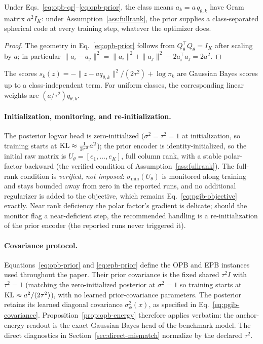\begin{proposition}
\label{prop:opb-frame}
Under Eqs.~\eqref{eq:opb-qr}--\eqref{eq:opb-prior}, the class means
$a_k = a\,q_{\theta,k}$ have Gram matrix $a^2 I_K$: under
Assumption~\ref{ass:fullrank}, the prior
supplies a class-separated spherical code at every training step, whatever the
optimizer does.
\end{proposition}

\begin{proof}
The geometry in Eq.~\eqref{eq:opb-prior} follows from
$Q_\theta^{\top}Q_\theta = I_K$ after scaling by $a$; in particular
$\|a_i - a_j\|^2 = \|a_i\|^2 + \|a_j\|^2 - 2a_i^{\top}a_j = 2a^2$.
\end{proof}

\begin{proposition}
\label{prop:opb-energy}
The scores $s_k(z)=-\|z-aq_{\theta,k}\|^2/(2\tau^2)+\log\pi_k$ are Gaussian Bayes
scores up to a class-independent term. For uniform classes, the corresponding linear
weights are $(a/\tau^2)q_{\theta,k}$.
\end{proposition}

\paragraph{Initialization, monitoring, and re-initialization.} The posterior logvar
head is zero-initialized ($\sigma^2 = \tau^2 = 1$ at initialization, so training
starts at $\operatorname{KL} \approx \tfrac{1}{2\tau^2} a^2$); the prior encoder is
identity-initialized, so the initial raw matrix is $U_\theta = [e_1, \dots, e_K]$,
full column rank, with a stable polar-factor backward (the verified condition of
Assumption~\ref{ass:fullrank}). The full-rank condition is \emph{verified, not
imposed}: $\sigma_{\min}(U_\theta)$ is monitored along training and stays bounded
away from zero in the reported runs, and no additional regularizer is added to the
objective, which remains Eq.~\eqref{eq:pgib-objective} exactly. Near rank deficiency
the polar factor's gradient is delicate; should the monitor flag a near-deficient
step, the recommended handling is a re-initialization of the prior encoder (the
reported runs never triggered it).

\paragraph{Covariance protocol.} Equations~\eqref{eq:opb-prior} and
\eqref{eq:epb-prior} define the OPB and EPB instances used throughout the paper.
Their prior covariance is the fixed shared $\tau^2I$ with $\tau^2=1$ (matching the
zero-initialized posterior at $\sigma^2=1$ so training starts at
$\operatorname{KL}\approx a^2/(2\tau^2)$), with no learned prior-covariance parameters. The
posterior retains its learned diagonal covariance $\sigma^2_\phi(x)$, as specified
in Eq.~\eqref{eq:pgib-covariance}. Proposition~\ref{prop:opb-energy} therefore
applies verbatim: the anchor-energy readout is the exact Gaussian Bayes head of the
benchmark model. The direct diagnostics in Section~\ref{sec:direct-mismatch}
normalize by the declared $\tau^2$.

